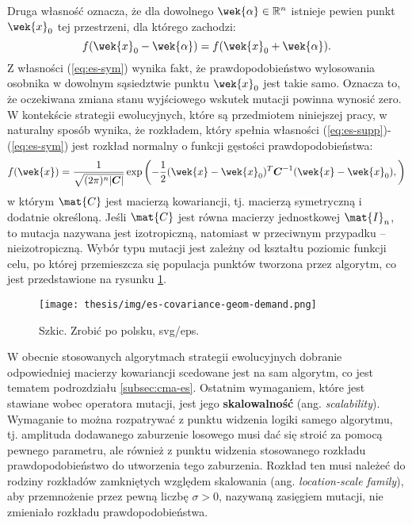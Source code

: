     Druga własność oznacza, że dla dowolnego $\wek{\alpha} \in \mathbb{R}^{n}$ istnieje pewien punkt $\wek{x}_0$ tej przestrzeni, dla którego zachodzi:
    \begin{equation}
        \label{eq:es-sym}
        f(\wek{x}_0 - \wek{\alpha}) = f(\wek{x}_0 + \wek{\alpha}).
    \end{equation}
    Z własności (\ref{eq:es-sym}) wynika fakt, że prawdopodobieństwo wylosowania osobnika w dowolnym sąsiedztwie punktu $\wek{x}_0$ jest takie samo. Oznacza to, że oczekiwana zmiana stanu wyjściowego wskutek mutacji powinna wynosić zero. 
    W kontekście strategii ewolucyjnych, które są przedmiotem niniejszej pracy, w naturalny sposób wynika, że rozkładem, który spełnia własności (\ref{eq:es-supp})-(\ref{eq:es-sym}) jest rozkład normalny o funkcji gęstości prawdopodobieństwa:
    \begin{equation*}
        f(\wek{x})=\frac{1}{\sqrt{(2\pi)^n|\boldsymbol C|}}
            \exp
            \left(
                -\frac{1}{2}({\wek{x}}-{\wek{x}_0})^T{\boldsymbol C}^{-1}({\wek{x}}-{\wek{x}_0}),
            \right)
    \end{equation*}
    w którym $\mat{C}$ jest macierzą kowariancji, tj. macierzą symetryczną i dodatnie określoną. Jeśli $\mat{C}$ jest równa macierzy jednostkowej $\mat{I}_n$, to mutacja nazywana jest izotropiczną, natomiast w przeciwnym przypadku -- nieizotropiczną. Wybór typu mutacji jest zależny od kształtu poziomic funkcji celu, po której przemieszcza się populacja punktów tworzona przez algorytm, co jest przedstawione na rysunku \ref{fig:poziomice}.
     \begin{figure}[h]
        \centering
        \texttt{[image: thesis/img/es-covariance-geom-demand.png]}
        \caption{Szkic. Zrobić po polsku, svg/eps.}
        \label{fig:poziomice}
    \end{figure}
    W obecnie stosowanych algorytmach strategii ewolucyjnych dobranie odpowiedniej macierzy kowariancji scedowane jest na sam algorytm, co jest tematem podrozdziału \ref{subsec:cma-es}.
    Ostatnim wymaganiem, które jest stawiane wobec operatora mutacji, jest jego \textbf{skalowalność} (ang. \textit{scalability}). Wymaganie to można rozpatrywać z punktu widzenia logiki samego algorytmu, tj. amplituda dodawanego zaburzenie losowego musi dać się stroić za pomocą pewnego parametru, ale również z punktu widzenia stosowanego rozkładu prawdopodobieństwo do utworzenia tego zaburzenia. Rozkład ten musi należeć do rodziny rozkładów zamkniętych względem skalowania (ang. \textit{location-scale family}), aby przemnożenie przez pewną liczbę $\sigma >0$, nazywaną zasięgiem mutacji, nie zmieniało rozkładu prawdopodobieństwa. \\
